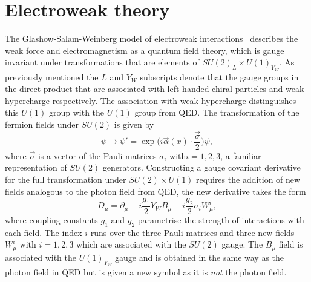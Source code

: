 \section{Electroweak theory}

The Glashow-Salam-Weinberg model of electroweak interactions~\cite{Glashow:1959,
  Salam:1959, Weinberg:1967} describes the weak force and electromagnetism as a
quantum field theory, which is gauge invariant under transformations that are
elements of $SU{(2)}_{L} \times U{(1)}_{Y_{W}}$. As previously mentioned the $L$
and $Y_{W}$ subscripts denote that the gauge groups in the direct product that
are associated with left-handed chiral particles and weak hypercharge
respectively. The association with weak hypercharge distinguishes this $U(1)$
group with the $U(1)$ group from QED. The transformation of the fermion fields
under $SU(2)$ is given by
\begin{equation}
  \label{eq:su2-trans}
  \psi \rightarrow \psi' =
  \exp\Big({i\vec{\alpha}(x)\cdot\frac{\vec{\sigma}}{2}}\Big)\psi,
\end{equation}
where $\vec{\sigma}$ is a vector of the Pauli matrices $\sigma_i\text{ with
}i=1,2,3$, a familiar representation of $SU(2)$ generators. Constructing a gauge
covariant derivative for the full transformation under $SU(2) \times U(1)$
requires the addition of new fields analogous to the photon field from QED, the
new derivative takes the form
\begin{equation}
  \label{eq:ew-derivative}
  D_{\mu} =
  \partial_{\mu} - i \frac{g_1}{2}Y_{W}B_{\mu} -
  i\frac{g_2}{2}\sigma_{i}W_{\mu}^{i},
\end{equation}
where coupling constants $g_1$ and $g_2$ parametrise the strength of
interactions with each field. The index $i$ runs over the three Pauli
matrices and three new fields $W^i_{\mu}\text{ with }i=1,2,3$ which are
associated with the $SU(2)$ gauge. The $B_{\mu}$ field is associated with the
$U(1)_{Y_{W}}$ gauge and is obtained in the same way as the photon field in QED
but is given a new symbol as it is \emph{not} the photon field.

